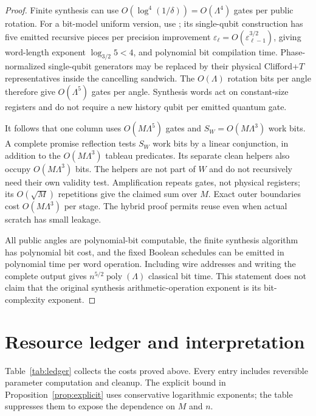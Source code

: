 \documentclass[11pt]{article}
\theoremstyle{definition}
\newcommand{\poly}{\operatorname{poly}}
\begin{document}
\begin{proof}
Finite synthesis can use $O(\log^4(1/\delta))=O(\Lambda^4)$ gates per
public rotation. For a bit-model uniform version, use \cite{mw}; its
single-qubit construction has five emitted recursive pieces per precision
improvement $\varepsilon_{\ell}=O(\varepsilon_{\ell-1}^{3/2})$, giving
word-length exponent $\log_{3/2}5<4$, and polynomial bit compilation
time. Phase-normalized single-qubit generators may be replaced by their
physical Clifford+$T$ representatives inside the cancelling sandwich.
The $O(\Lambda)$ rotation bits per angle therefore give $O(\Lambda^5)$
gates per angle. Synthesis words act on constant-size registers and do
not require a new history qubit per emitted quantum gate.

It follows that one column uses $O(M\Lambda^5)$ gates and
$S_W=O(M\Lambda^3)$ work bits. A complete promise reflection tests
$S_W$ work bits by a linear conjunction, in addition to the
$O(M\Lambda^3)$ tableau predicates. Its separate clean helpers also
occupy $O(M\Lambda^3)$ bits. The helpers are not part of $W$ and do
not recursively need their own validity test. Amplification repeats gates,
not physical registers; its $O(\sqrt M)$ repetitions give the claimed
sum over $M$. Exact outer boundaries cost $O(M\Lambda^3)$ per stage.
The hybrid proof permits reuse even when actual scratch has small leakage.

All public angles are polynomial-bit computable, the finite synthesis
algorithm has polynomial bit cost, and the fixed Boolean schedules can be
emitted in polynomial time per word operation. Including wire addresses
and writing the complete output gives $n^{5/2}\poly(\Lambda)$ classical
bit time. This statement does not claim that the original synthesis
arithmetic-operation exponent is its bit-complexity exponent.
\end{proof}

\section{Resource ledger and interpretation}\label{sec:ledger}

Table~\ref{tab:ledger} collects the costs proved above. Every entry includes
reversible parameter computation and cleanup. The explicit bound in
Proposition~\ref{prop:explicit} uses conservative logarithmic exponents;
the table suppresses them to expose the dependence on $M$ and $n$.
\end{document}
